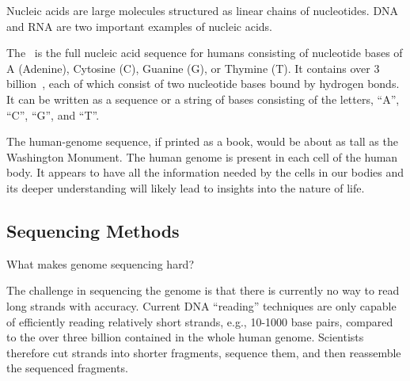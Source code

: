 \begin{definition}
Nucleic acids are large molecules structured as linear chains of
nucleotides.  DNA and RNA are two important examples of nucleic acids.
\end{definition}

\begin{definition}

The~ is the full nucleic acid sequence for humans
consisting of nucleotide bases of A (Adenine), Cytosine (C),
Guanine (G), or Thymine (T).
%
It contains over $3$ billion~, each of which consist
of two nucleotide bases bound by hydrogen bonds.
%
It can be written as a sequence or a string of bases consisting of the
letters, ``A'', ``C'', ``G'', and ``T''.
%
\end{definition}

\begin{remark}
The human-genome sequence, if printed as a book, would be
about as tall as the Washington Monument.
%
The human genome is present in each cell of the human body. 
%
It appears to have all the information needed by the cells in our
bodies and its deeper understanding will likely lead to insights into
the nature of life.
\end{remark}






\subsection{Sequencing Methods}


\begin{teachask}
What makes genome sequencing hard?
\end{teachask}
%

\begin{gram}
The challenge in sequencing the genome is that there is currently
no way to read long strands with accuracy. 
%
Current DNA ``reading'' techniques are only capable of efficiently
reading relatively short strands, e.g., 10-1000 base pairs, compared
to the over three billion contained in the whole human genome.
%
Scientists therefore cut strands into shorter fragments, sequence
them, and then reassemble the sequenced fragments.
%
\end{gram}


